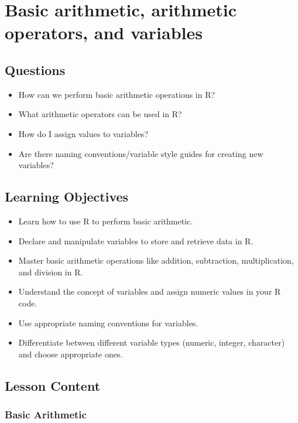 \documentclass[
  letterpaper,
  DIV=11,
  numbers=noendperiod]{scrreprt}
\begin{document}

\chapter{Basic arithmetic, arithmetic operators, and
variables}\label{sec-arithmetic-variables}

\section{Questions}\label{questions-5}

\begin{itemize}
\item
  How can we perform basic arithmetic operations in R?
\item
  What arithmetic operators can be used in R?
\item
  How do I assign values to variables?
\item
  Are there naming conventions/variable style guides for creating new
  variables?
\end{itemize}

\section{Learning Objectives}\label{learning-objectives-5}

\begin{itemize}
\item
  Learn how to use R to perform basic arithmetic.
\item
  Declare and manipulate variables to store and retrieve data in R.
\item
  Master basic arithmetic operations like addition, subtraction,
  multiplication, and division in R.
\item
  Understand the concept of variables and assign numeric values in your
  R code.
\item
  Use appropriate naming conventions for variables.
\item
  Differentiate between different variable types (numeric, integer,
  character) and choose appropriate ones.
\end{itemize}

\section{Lesson Content}\label{lesson-content-5}

\subsection{Basic Arithmetic}\label{basic-arithmetic}
\end{document}

